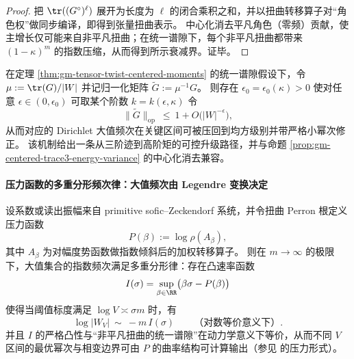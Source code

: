 \begin{proof}
把 \(\tr((G^\circ)^\ell)\) 展开为长度为 \(\ell\) 的闭合乘积之和，并以扭曲转移算子对“角色权”做同步编译，即得到张量扭曲表示。
中心化消去平凡角色（零频）贡献，使主增长仅可能来自非平凡扭曲；在统一谱隙下，每个非平凡扭曲都带来 \((1-\kappa)^m\) 的指数压缩，从而得到所示衰减界。证毕。
\end{proof}

\begin{corollary}\label{cor:gm-adjustable-moment-mean-square}
在定理 \ref{thm:gm-tensor-twist-centered-moments} 的统一谱隙假设下，令 \(\mu:=\tr(G)/|W|\) 并记归一化矩阵 \(\widetilde G:=\mu^{-1}G\)。
则存在 \(\epsilon_0=\epsilon_0(\kappa)>0\) 使对任意 \(\epsilon\in(0,\epsilon_0)\) 可取某个阶数 \(k=k(\epsilon,\kappa)\) 令
\[
\|\widetilde G\|_{\mathrm{op}}
\ \le\
1+O\!\bigl(|W|^{-\epsilon}\bigr),
\]
从而对应的 Dirichlet 大值频次在关键区间可被压回到均方级别并带严格小幂次修正。
该机制给出一条从三阶迹到高阶矩的可控升级路径，并与命题 \ref{prop:gm-centered-trace3-energy-variance} 的中心化消去兼容。
\end{corollary}

\paragraph{压力函数的多重分形频次律：大值频次由 Legendre 变换决定}
\begin{theorem}\label{thm:gm-multifractal-pressure-legendre}
设系数或读出振幅来自 primitive sofic--Zeckendorf 系统，并令扭曲 Perron 根定义压力函数
\[
P(\beta):=\log\rho(A_\beta),
\]
其中 \(A_\beta\) 为对幅度势函数做指数倾斜后的加权转移算子。
则在 \(m\to\infty\) 的极限下，大值集合的指数频次满足多重分形律：存在凸速率函数
\[
I(\sigma)=\sup_{\beta\in\RR}\bigl(\beta\sigma-P(\beta)\bigr)
\]
使得当阈值标度满足 \(\log V\asymp \sigma m\) 时，有
\[
\log |W_V|\ \sim\ -m\,I(\sigma)
\qquad\text{（对数等价意义下）}.
\]
并且 \(I\) 的严格凸性与“非平凡扭曲的统一谱隙”在动力学意义下等价，从而不同 \(V\) 区间的最优幂次与相变边界可由 \(P\) 的曲率结构可计算输出（参见 \cite{Ruelle1978Thermodynamic} 的压力形式）。
\end{theorem}

\endinput
